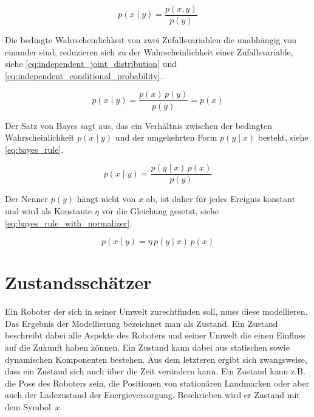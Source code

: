 

\begin{equation}
p(x \mid y) = \frac{p(x, y)}{p(y)} \label{eq:conditional_probability}
\end{equation}

Die bedingte Wahrscheinlichkeit von zwei Zufallsvariablen die unabhängig von einander sind, reduzieren sich zu der Wahrscheinlichkeit einer Zufallsvariable, siehe \autoref{eq:independent_joint_distribution} und \autoref{eq:independent_conditional_probability}.

\begin{equation}
p(x \mid y) = \frac{p(x) \, p(y)}{p(y)} = p(x) \label{eq:independent_conditional_probability}
\end{equation}

Der Satz von Bayes sagt aus, das ein Verhältnis zwischen der bedingten Wahrscheinlichkeit $p(x \mid y)$ und der umgekehrten Form $p(y \mid x)$ besteht, siehe \autoref{eq:bayes_rule}.

\begin{equation}
p(x \mid y) = \frac{p(y \mid x) \, p(x)}{p(y)} \label{eq:bayes_rule}
\end{equation}

Der Nenner $p(y)$ hängt nicht von $x$ ab, ist daher für jedes Ereignis konstant und wird als Konstante $\eta$ vor die Gleichung gesetzt, siehe \autoref{eq:bayes_rule_with_normalizer}.

\begin{equation}
p(x \mid y) = \eta \, p(y \mid x) \, p(x) \label{eq:bayes_rule_with_normalizer}
\end{equation}


%
%
%
\section{Zustandsschätzer}
\label{sec:state_estimator}

Ein Roboter der sich in seiner Umwelt zurechtfinden soll, muss diese modellieren. Das Ergebnis der Modellierung bezeichnet man als Zustand. Ein Zustand beschreibt dabei alle Aspekte des Roboters und seiner Umwelt die einen Einfluss auf die Zukunft haben können. Ein Zustand kann dabei aus statischen sowie dynamischen Komponenten bestehen. Aus dem letzteren ergibt sich zwangsweise, dass ein Zustand sich auch über die Zeit verändern kann. Ein Zustand kann z.B. die Pose des Roboters sein, die Positionen von stationären Landmarken oder aber auch der Ladezustand der Energieversorgung. Beschrieben wird er Zustand mit dem Symbol~$x$.


